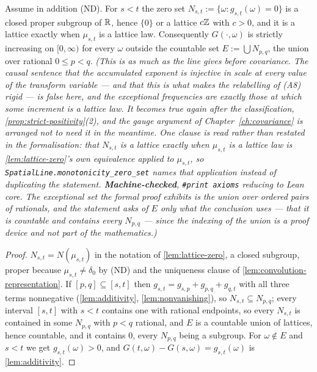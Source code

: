 \begin{corollary}\label{cor:monotonicity}
\leanok
Assume in addition (ND). For $s < t$ the zero set
$N_{s,t} := \{\omega : g_{s,t}(\omega) = 0\}$ is a closed proper subgroup of $\mathbb{R}$, hence
$\{0\}$ or a lattice $c\mathbb{Z}$ with $c > 0$, and it is a lattice exactly when $\mu_{s,t}$ is a
lattice law. Consequently $G(\cdot,\omega)$ is strictly increasing on $[0,\infty)$ for every
$\omega$ outside the countable set $E := \bigcup N_{p,q}$, the union over rational
$0 \le p < q$.
\statusT\quad\emph{(This is as much as the line gives before covariance. The causal sentence
that the accumulated exponent is injective in scale at every value of the transform variable
--- and that this is what makes the relabelling of (A8) rigid --- is false here, and the
exceptional frequencies are exactly those at which some increment is a lattice law. It becomes
true again after the classification, \ref{prop:strict-positivity}(2), and the gauge argument of
Chapter~\ref{ch:covariance} is arranged not to need it in the meantime. One clause is read
rather than restated in the formalisation: that $N_{s,t}$ is a lattice exactly when
$\mu_{s,t}$ is a lattice law is \ref{lem:lattice-zero}'s own equivalence applied to
$\mu_{s,t}$, so \texttt{SpatialLine.monotonicity\_zero\_set} names that application instead of
duplicating the statement. \textbf{Machine-checked}, \texttt{\#print axioms} reducing to Lean
core. The exceptional set the formal proof exhibits is the union over ordered pairs of
rationals, and the statement asks of $E$ only what the conclusion uses --- that it is countable
and contains every $N_{p,q}$ --- since the indexing of the union is a proof device and not part
of the mathematics.)}
\end{corollary}

\begin{proof}
\leanok
$N_{s,t} = N(\mu_{s,t})$ in the notation of \ref{lem:lattice-zero}, a closed subgroup, proper
because $\mu_{s,t} \ne \delta_0$ by (ND) and the uniqueness clause of
\ref{lem:convolution-representation}. If $[p,q] \subseteq [s,t]$ then
$g_{s,t} = g_{s,p} + g_{p,q} + g_{q,t}$ with all three terms nonnegative
(\ref{lem:additivity}, \ref{lem:nonvanishing}), so $N_{s,t} \subseteq N_{p,q}$; every interval
$[s,t]$ with $s < t$ contains one with rational endpoints, so every $N_{s,t}$ is contained in
some $N_{p,q}$ with $p < q$ rational, and $E$ is a countable union of lattices, hence
countable, and it contains $0$, every $N_{p,q}$ being a subgroup. For $\omega \notin E$ and
$s < t$ we get $g_{s,t}(\omega) > 0$, and
$G(t,\omega) - G(s,\omega) = g_{s,t}(\omega)$ is \ref{lem:additivity}.
\end{proof}

